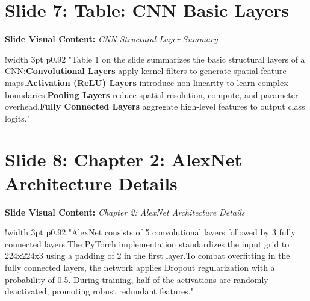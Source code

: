 \documentclass[11pt]{article}
\begin{document}
\section{Slide 7: Table: CNN Basic Layers}
\textbf{Slide Visual Content:} \textit{CNN Structural Layer Summary}\\ [8pt]
\noindent
\begin{tabular}{!{\color{primary}\vrule width 3pt} p{0.92\textwidth}}
  \small\color{black!80} "Table 1 on the slide summarizes the basic structural layers of a CNN:\newline\newline *   \textbf{Convolutional Layers} apply kernel filters to generate spatial feature maps.\newline\newline *   \textbf{Activation (ReLU) Layers} introduce non-linearity to learn complex boundaries.\newline\newline *   \textbf{Pooling Layers} reduce spatial resolution, compute, and parameter overhead.\newline\newline *   \textbf{Fully Connected Layers} aggregate high-level features to output class logits."
\end{tabular}
\vspace{15pt}

\section{Slide 8: Chapter 2: AlexNet Architecture Details}
\textbf{Slide Visual Content:} \textit{Chapter 2: AlexNet Architecture Details}\\ [8pt]
\noindent
\begin{tabular}{!{\color{primary}\vrule width 3pt} p{0.92\textwidth}}
  \small\color{black!80} "AlexNet consists of 5 convolutional layers followed by 3 fully connected layers.\newline\newline The PyTorch implementation standardizes the input grid to 224x224x3 using a padding of 2 in the first layer.\newline\newline To combat overfitting in the fully connected layers, the network applies Dropout regularization with a probability of 0.5. During training, half of the activations are randomly deactivated, promoting robust redundant features."
\end{tabular}
\vspace{15pt}
\end{document}

